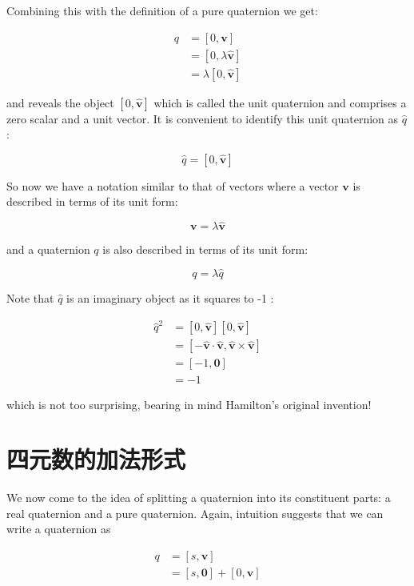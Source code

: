 Combining this with the definition of a pure quaternion we get:

$$
    \begin{aligned}
        q & =[0, \mathbf{v}]               \\
          & =[0, \lambda \hat{\mathbf{v}}] \\
          & =\lambda[0, \hat{\mathbf{v}}]
    \end{aligned}
$$

and reveals the object $[0, \hat{\mathbf{v}}]$ which is called the unit quaternion and comprises a zero scalar and a unit vector. It is convenient to identify this unit quaternion as $\hat{q}$ :

$$
    \hat{q}=[0, \hat{\mathbf{v}}]
$$

So now we have a notation similar to that of vectors where a vector $\mathbf{v}$ is described in terms of its unit form:

$$
    \mathbf{v}=\lambda \hat{\mathbf{v}}
$$

and a quaternion $q$ is also described in terms of its unit form:

$$
    q=\lambda \hat{q}
$$

Note that $\hat{q}$ is an imaginary object as it squares to -1 :

$$
    \begin{aligned}
        \hat{q}^{2} & =[0, \hat{\mathbf{v}}][0, \hat{\mathbf{v}}]                                           \\
                    & =[-\hat{\mathbf{v}} \cdot \hat{\mathbf{v}}, \hat{\mathbf{v}} \times \hat{\mathbf{v}}] \\
                    & =[-1, \mathbf{0}]                                                                     \\
                    & =-1
    \end{aligned}
$$

which is not too surprising, bearing in mind Hamilton's original invention!

\section{四元数的加法形式}
We now come to the idea of splitting a quaternion into its constituent parts: a real quaternion and a pure quaternion. Again, intuition suggests that we can write a quaternion as

$$
    \begin{aligned}
        q & =[s, \mathbf{v}]                 \\
          & =[s, \mathbf{0}]+[0, \mathbf{v}]
    \end{aligned}
$$

